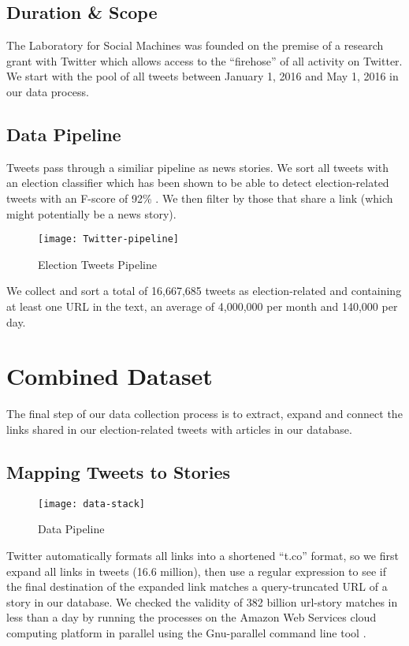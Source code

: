 \subsection{Duration \& Scope} 
The Laboratory for Social Machines was founded on the premise of a research grant with Twitter which allows access to the ``firehose'' of all activity on Twitter. We start with the pool of all tweets between January 1, 2016 and May 1, 2016 in our data process.

\subsection{Data Pipeline}

Tweets pass through a similiar pipeline as news stories. We sort all tweets with an election classifier which has been shown to be able to detect election-related tweets with an F-score of 92\% \cite{vijayaraghavan2016automatic}. We then filter by those that share a link (which might potentially be a news story).

\begin{figure}[H]  
\centering 
  \texttt{[image: Twitter-pipeline]}  
  \caption{Election Tweets Pipeline
    \label{fig:data-stack-Twitter}}
\end{figure} 

We collect and sort a total of 16,667,685 tweets as election-related and containing at least one URL in the text, an average of 4,000,000 per month and 140,000 per day.

\section{Combined Dataset}
The final step of our data collection process is to extract, expand and connect the links shared in our election-related tweets with articles in our database.
 
\subsection{Mapping Tweets to Stories}
\begin{figure}[H]  
\centering 
  \texttt{[image: data-stack]}  
  \caption{Data Pipeline
    \label{fig:data-stack}}
\end{figure}
 
Twitter automatically formats all links into a shortened ``t.co'' format, so we first expand all links in tweets (16.6 million), then use a regular expression to see if the final destination of the expanded link matches a query-truncated URL of a story in our database. We checked the validity of 382 billion url-story matches in less than a day by running the processes on the Amazon Web Services cloud computing platform in parallel using the Gnu-parallel command line tool \cite{tange2011gnu}.

